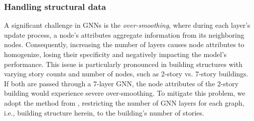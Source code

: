 \subsubsection{Handling structural data}
\label{subsubsec:handle_structural_data}
A significant challenge in GNNs is the {\em{over-smoothing}}, where during each layer's update process, a node's attributes aggregate information from its neighboring nodes. Consequently, increasing the number of layers causes node attributes to homogenize, losing their specificity and  negatively impacting the model's performance. This issue is particularly pronounced in building structures with varying story counts and number of nodes, such as 2-story vs. 7-story buildings. If both are passed through a 7-layer GNN, the node attributes of the 2-story building would experience severe over-smoothing. 
To mitigate this problem, we adopt the method from \cite{chou_structgnn_2024}, restricting the number of GNN layers for each graph, i.e., building structure herein, to the building's number of stories. 

